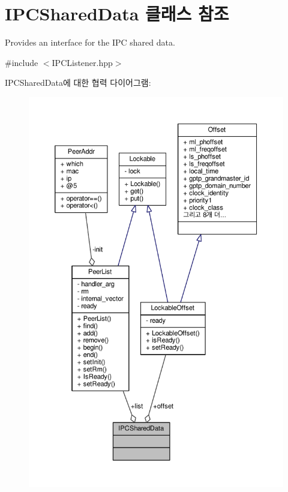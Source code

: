 \hypertarget{class_i_p_c_shared_data}{}\section{I\+P\+C\+Shared\+Data 클래스 참조}
\label{class_i_p_c_shared_data}


Provides an interface for the I\+PC shared data.  




{\ttfamily \#include $<$I\+P\+C\+Listener.\+hpp$>$}



I\+P\+C\+Shared\+Data에 대한 협력 다이어그램\+:
\nopagebreak
\begin{figure}[H]
\begin{center}
\leavevmode
\includegraphics[width=350pt]{class_i_p_c_shared_data__coll__graph}
\end{center}
\end{figure}
